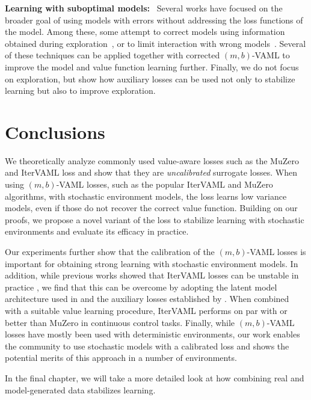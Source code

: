 \textbf{Learning with suboptimal models:}~ Several works have focused on the broader goal of using models with errors without addressing the loss functions of the model.
Among these, some attempt to correct models using information obtained during exploration~\parencite{joseph2013reinforcement,talvitie2017self,modi2020sample,rakhsha2022operator,rakhsha2024maximum}, or to limit interaction with wrong models~\parencite{buckman2018sample,janner2019mbpo,pmlr-v119-abbas20a}.
Several of these techniques can be applied together with corrected $(m,b)$-VAML to improve the model and value function learning further.
Finally, we do not focus on exploration, but \textcite{guo2022byolexplore} show how auxiliary losses can be used not only to stabilize learning but also to improve exploration.

\section{Conclusions}


We theoretically analyze commonly used value-aware losses such as the MuZero and IterVAML loss and show that they are \emph{uncalibrated} surrogate losses.
When using $(m,b)$-VAML losses, such as the popular IterVAML and MuZero algorithms, with stochastic environment models, the loss learns low variance models, even if those do not recover the correct value function.
Building on our proofs, we propose a novel variant of the loss to stabilize learning with stochastic environments and evaluate its efficacy in practice.

Our experiments further show that the calibration of the $(m,b)$-VAML losses is important for obtaining strong learning with stochastic environment models.
In addition, while previous works showed that IterVAML losses can be unstable in practice \parencite{lovatto2020decision,voelcker2022value}, we find that this can be overcome by adopting the latent model architecture used in \textcite{schrittwieser2020mastering} and the auxiliary losses established by \textcite{li2023efficient,hansen2022temporal}.
When combined with a suitable value learning procedure, IterVAML performs on par with or better than MuZero in continuous control tasks.
Finally, while $(m,b)$-VAML losses have mostly been used with deterministic environments, our work enables the community to use stochastic models with a calibrated loss and shows the potential merits of this approach in a number of environments.

In the final chapter, we will take a more detailed look at how combining real and model-generated data stabilizes learning.
